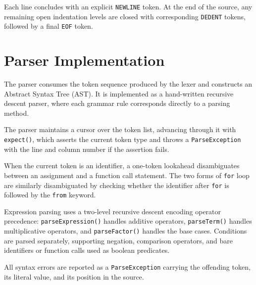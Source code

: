 Each line concludes with an explicit \texttt{NEWLINE} token. At the end of the source, any remaining open indentation levels are closed with corresponding \texttt{DEDENT} tokens, followed by a final \texttt{EOF} token.

\section{Parser Implementation}

The parser consumes the token sequence produced by the lexer and constructs an Abstract Syntax Tree (AST). 
It is implemented as a hand-written recursive descent parser, where each grammar rule corresponds directly to a parsing method.

The parser maintains a cursor over the token list, advancing through it with \texttt{expect()}, which asserts the current token type and throws a \texttt{ParseException} with the line and column number if the assertion fails.

When the current token is an identifier, a one-token lookahead disambiguates between an assignment and a function call statement. The two forms of \texttt{for} loop are similarly disambiguated by checking whether the identifier after \texttt{for} is followed by the \texttt{from} keyword.

Expression parsing uses a two-level recursive descent encoding operator precedence: \texttt{parseExpression()} handles additive operators, \texttt{parseTerm()} handles multiplicative operators, and \texttt{parseFactor()} handles the base cases. Conditions are parsed separately, supporting negation, comparison operators, and bare identifiers or function calls used as boolean predicates.

All syntax errors are reported as a \texttt{ParseException} carrying the offending token, its literal value, and its position in the source.